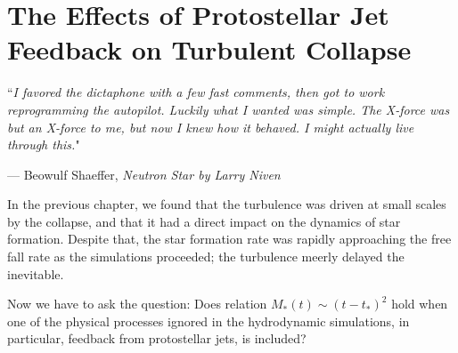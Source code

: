 \documentclass[../dissertation.tex]{subfiles}
\begin{document}
\chapter[Jet Feedback in Star Formation]{The Effects of Protostellar Jet Feedback on Turbulent Collapse}
\label{ch:jet}


\singlespace
\epigraph{``\emph{I favored the dictaphone with a few fast comments, then got to work reprogramming the autopilot. Luckily what I wanted was simple. The X-force was but an X-force to me, but now I knew how it behaved. I might actually live through this.}"}{--- \textup{Beowulf Shaeffer}, \textit{Neutron Star by Larry Niven}}

\dblspace

%
In the previous chapter, we found that the turbulence was driven at small scales by the collapse, and that it  had a direct impact on the dynamics of star formation. Despite that, the star formation rate was rapidly approaching the free fall rate as the simulations proceeded; the turbulence meerly delayed the inevitable.

Now we have to ask the question: Does relation $M_*(t)\sim (t-t_*)^2$ hold when one of the physical processes ignored in the hydrodynamic simulations, in particular, feedback from protostellar jets, is included? 
\end{document}
